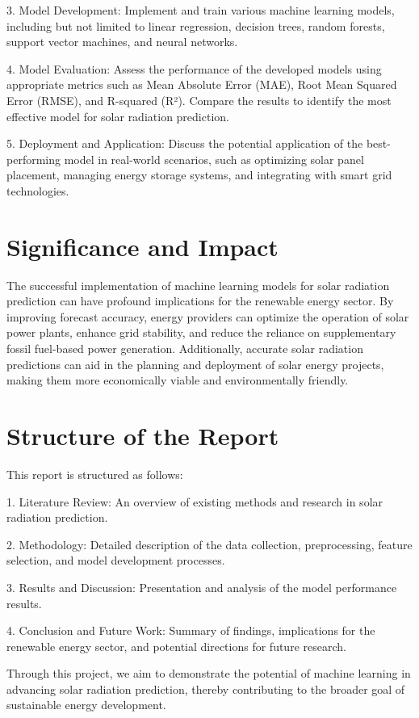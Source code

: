 \documentclass[12pt,a4paper]{report}
\begin{document}
3. Model Development: Implement and train various machine learning models, including but not limited to linear regression, decision trees, random forests, support vector machines, and neural networks.

4. Model Evaluation: Assess the performance of the developed models using appropriate metrics such as Mean Absolute Error (MAE), Root Mean Squared Error (RMSE), and R-squared (R²). Compare the results to identify the most effective model for solar radiation prediction.

5. Deployment and Application: Discuss the potential application of the best-performing model in real-world scenarios, such as optimizing solar panel placement, managing energy storage systems, and integrating with smart grid technologies.

\section{Significance and Impact}

The successful implementation of machine learning models for solar radiation prediction can have profound implications for the renewable energy sector. By improving forecast accuracy, energy providers can optimize the operation of solar power plants, enhance grid stability, and reduce the reliance on supplementary fossil fuel-based power generation. Additionally, accurate solar radiation predictions can aid in the planning and deployment of solar energy projects, making them more economically viable and environmentally friendly.

\section{Structure of the Report}

This report is structured as follows:

1. Literature Review: An overview of existing methods and research in solar radiation prediction.
   
2. Methodology: Detailed description of the data collection, preprocessing, feature selection, and model development processes.
   
3. Results and Discussion: Presentation and analysis of the model performance results.
   
4. Conclusion and Future Work: Summary of findings, implications for the renewable energy sector, and potential directions for future research.

Through this project, we aim to demonstrate the potential of machine learning in advancing solar radiation prediction, thereby contributing to the broader goal of sustainable energy development.
\end{document}
